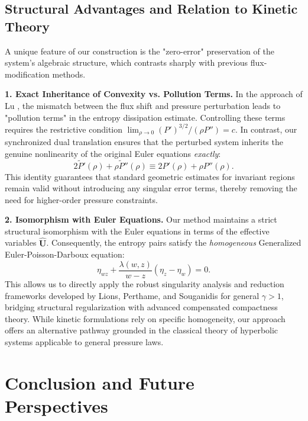 \documentclass[12pt, reqno]{article}
\theoremstyle{definition}
\numberwithin{equation}{section}
\begin{document}
\subsection{Structural Advantages and Relation to Kinetic Theory}

A unique feature of our construction is the "zero-error" preservation of the system's algebraic structure, which contrasts sharply with previous flux-modification methods.

\textbf{1. Exact Inheritance of Convexity vs. Pollution Terms.}
In the approach of Lu \cite{Lu2007}, the mismatch between the flux shift and pressure perturbation leads to "pollution terms" in the entropy dissipation estimate. Controlling these terms requires the restrictive condition $\lim_{\rho\to 0} (P')^{3/2}/(\rho P'') = c$.
In contrast, our synchronized dual translation ensures that the perturbed system inherits the genuine nonlinearity of the original Euler equations \textit{exactly}:
\begin{equation}
    2\tilde{P}'(\rho) + \rho \tilde{P}''(\rho) \equiv 2P'(\rho) + \rho P''(\rho).
\end{equation}
This identity guarantees that standard geometric estimates for invariant regions remain valid without introducing any singular error terms, thereby removing the need for higher-order pressure constraints.

\textbf{2. Isomorphism with Euler Equations.}
Our method maintains a strict structural isomorphism with the Euler equations in terms of the effective variables $\hat{\mathbf{U}}$. Consequently, the entropy pairs satisfy the \textit{homogeneous} Generalized Euler-Poisson-Darboux equation:
\begin{equation}
    \eta_{wz} + \frac{\lambda(w,z)}{w-z} (\eta_z - \eta_w) = 0.
\end{equation}
This allows us to directly apply the robust singularity analysis and reduction frameworks developed by Lions, Perthame, and Souganidis \cite{Lions1996} for general $\gamma > 1$, bridging structural regularization with advanced compensated compactness theory. While kinetic formulations \cite{Lions1994} rely on specific homogeneity, our approach offers an alternative pathway grounded in the classical theory of hyperbolic systems applicable to general pressure laws.

\section{Conclusion and Future Perspectives}
\label{sec:conclusion}
\end{document}
